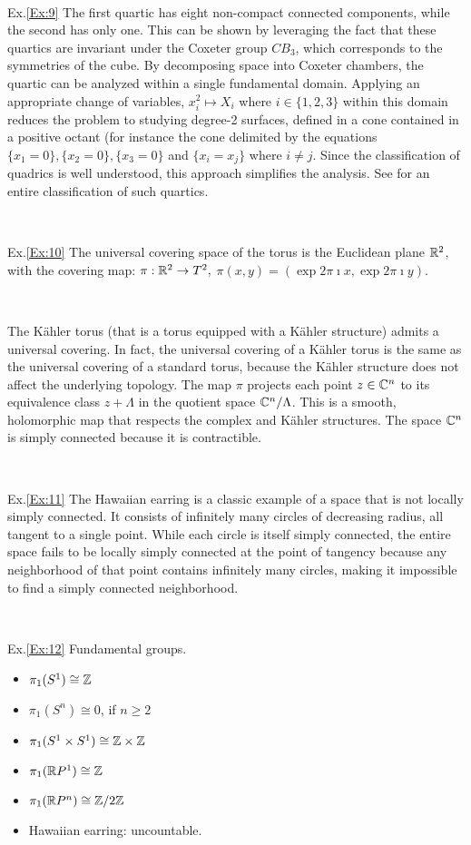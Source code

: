 \, 


Ex.\ref{Ex:9} The first quartic has eight non-compact connected components, while the second has only one. This can be shown by leveraging the fact that these quartics are invariant under the Coxeter group $CB_3$, which corresponds to the symmetries of the cube. By decomposing space into Coxeter chambers, the quartic can be analyzed within a single fundamental domain. Applying an appropriate change of variables, $x_i^2\mapsto X_i$ where $i\in \{1,2,3\}$ within this domain reduces the problem to studying degree-2 surfaces, defined in a cone contained in a positive octant (for instance the cone delimited by the equations 
$\{x_1=0\},\{x_2=0\},\{x_3=0\}$ and $\{x_i=x_j\}$ where $i\neq j$. 
Since the classification of quadrics is well understood, this approach simplifies the analysis. See \cite{C18} for an entire classification of such quartics. 

\, 

Ex.\ref{Ex:10} The universal covering space of the torus 
 is the Euclidean plane 
$\mathbb{R}^2$, with the covering map: $ \pi:\mathbb{R}^2\to T^2,$ 
$ \pi(x,y)=(\exp{2\pi\imath x},\exp{2\pi\imath y})$.

\, 

The Kähler torus (that is a torus equipped with a Kähler structure) admits a universal covering. In fact, the universal covering of a Kähler torus is the same as the universal covering of a standard torus, because the Kähler structure does not affect the underlying topology.
The map $\pi$ projects each point $z\in \mathbb{C}^n$ to its equivalence class 
$z+\Lambda$ in the quotient space $\mathbb{C}^n/\Lambda$.
This is a smooth, holomorphic map that respects the complex and Kähler structures.
The space $\mathbb{C}^n$ is simply connected because it is contractible.

\, 

Ex.\ref{Ex:11} The Hawaiian earring is a classic example of a space that is not locally simply connected. It consists of infinitely many circles of decreasing radius, all tangent to a single point. While each circle is itself simply connected, the entire space fails to be locally simply connected at the point of tangency because any neighborhood of that point contains infinitely many circles, making it impossible to find a simply connected neighborhood.

\, 

Ex.\ref{Ex:12} Fundamental groups. 
\begin{itemize}
    \item $\pi_1(S^1)\cong \mathbb{Z}$
    \item $\pi_1(S^n)\cong 0$, if $n\geq 2$
    \item $\pi_1(S^1\times S^1)\cong \mathbb{Z}\times \mathbb{Z}$
    \item $\pi_1(\mathbb{R} P^1)\cong \mathbb{Z}$
    \item $\pi_1(\mathbb{R} P^n)\cong \mathbb{Z}/2\mathbb{Z}$
    \item Hawaiian earring: uncountable. 
\end{itemize}

